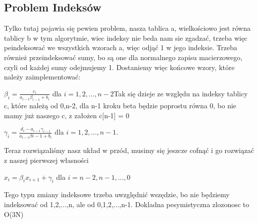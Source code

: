 \documentclass[12pt]{article}
\begin{document}
\subsection{Problem Indeksów}
Tylko tutaj pojawia się pewien problem, nasza tablica a, wielkościowo jest równa tablicy b w tym algorytmie, wiec indeksy nie beda nam sie zgadzać, trzeba więc peindeksować we wszystkich wzorach a, więc odjąć 1 w jego indeksie. Trzeba również przeindeksować sumy, bo są one dla normalnego zapisu macierzowego, czyli od każdej sumy odejmujemy 1. Dostaniemy więc końcowe wzory, które należy zaimplementować:
\begin{center}
$\beta_{i} = \frac{c_{i}}{a_{i-1}\beta_{i-1}+b_{i}}$ dla $i=1,2,...,n-2$\newline\newline Tak się dzieje ze względu na indeksy tablicy c, które należą od 0,n-2, dla n-1 kroku beta będzie poprostu równa 0, bo nie mamy już naszego c, z założen c[n-1] = 0
\end{center}
\begin{center}
$\gamma_{i} = \frac{d_{i}-a_{i-1}\gamma_{i-1}}{a_{i-1}\beta{i-1}+b_{i}}$ dla $i=1,2,...,n-1$.\newline\newline
\end{center}
Teraz rozwiązaliśmy nasz układ w przód, musimy się jeszcze cofnąć i go rozwiązać z naszej pierwszej własności 
\begin{center}
$x_{i} = \beta_{i}x_{i+1}+\gamma_{i}$ dla $i = n-2, n-1,...,0$
\end{center}
Tego typu zmiany indeksowe trzeba uwzględnić wszędzie, bo nie będziemy indeksować od 1,2,...,n, ale od 0,1,2,...,n-1.
Dokladna pesymistyczna zlozonosc to O(3N)
\end{document}
